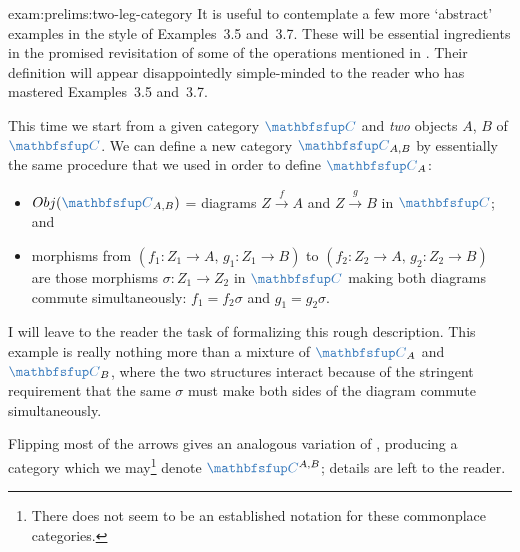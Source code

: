\begin{exam}{}{exam:prelims:two-leg-category}
  It is useful to contemplate a few more `abstract' examples in the
  style of Examples~3.5 and~3.7. These will be essential ingredients
  in the promised revisitation of some of the operations mentioned in
  . Their definition
  will appear disappointedly simple-minded to the reader who has
  mastered Examples~3.5 and~3.7.

  This time we start from a given category $\categ{C}$ and \emph{two}
  objects $A$, $B$ of $\categ{C}$. We can define a new category
  $\categ{C}_{A,B}$ by essentially the same procedure that we used in
  order to define $\categ{C}_A$:
  \begin{itemize}
  \item $\Obj(\categ{C}_{A,B})$ = diagrams
    $Z \xrightarrow{f} A$ and $Z \xrightarrow{g} B$ in $\categ{C}$;
    and
  \item morphisms from $(f_1 : Z_1 \to A,\, g_1 : Z_1 \to B)$ to
    $(f_2 : Z_2 \to A,\, g_2 : Z_2 \to B)$ are those morphisms
    $\sigma : Z_1 \to Z_2$ in $\categ{C}$ making both diagrams commute
    simultaneously: $f_1 = f_2 \sigma$ and $g_1 = g_2 \sigma$.
  \end{itemize}
  I will leave to the reader the task of formalizing this rough
  description. This example is really nothing more than a mixture of
  $\categ{C}_A$ and $\categ{C}_B$, where the two structures interact
  because of the stringent requirement that the same $\sigma$ must
  make both sides of the diagram commute simultaneously.

  Flipping most of the arrows gives an analogous variation of
  , producing a category which we
  may\footnote{There does not seem to be an established notation for
    these commonplace categories.} denote $\categ{C}^{A,B}$; details
  are left to the reader.
\end{exam}

